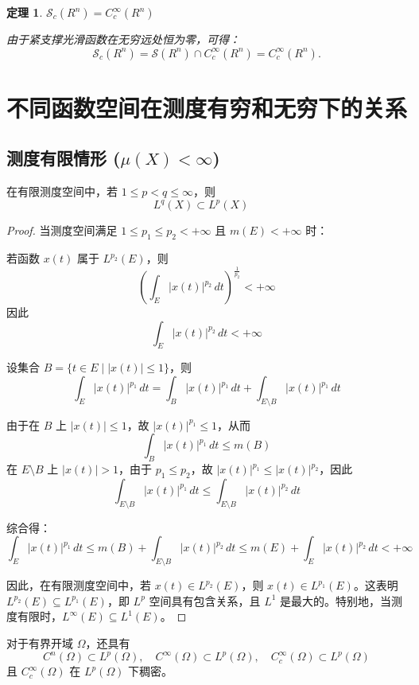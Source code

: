 \documentclass[12pt,a4paper]{article}
\newcommand{\R}{\mathbb{R}}                %
\def\R{R}%
\theoremstyle{plain}
\newtheorem{theorem}{定理}[section]
\theoremstyle{definition}
\theoremstyle{remark}
\begin{document}
\begin{theorem}$\mathcal S_c(\R^n)=C_c^\infty(\R^n)$
	
	
	由于紧支撑光滑函数在无穷远处恒为零，可得：
	\[
	\mathcal S_c(\R^n)
	=\mathcal S(\R^n)\cap C_c^\infty(\R^n)
	=C_c^\infty(\R^n).
	\]
	\end{theorem}
	
	\section{不同函数空间在测度有穷和无穷下的关系}
	
	\subsection{测度有限情形 ($\mu(X)<\infty$)}
	
	在有限测度空间中，若 $1\leq p<q\le\infty$，则
	\[
	L^q(X)\subset L^p(X)\quad
	\]
	
	\begin{proof}
	当测度空间满足 $1 \leq p_1 \leq p_2 < +\infty$ 且 $m(E) < +\infty$ 时：
	
	若函数 $x(t)$ 属于 $L^{p_2}(E)$，则
	\[
	\left( \int_E |x(t)|^{p_2} \, dt \right)^{\frac{1}{p_2}} < +\infty
	\]
	因此
	\[
	\int_E |x(t)|^{p_2} \, dt < +\infty
	\]
	
	设集合 $B = \{ t \in E \mid |x(t)| \leq 1 \}$，则
	\[
	\int_E |x(t)|^{p_1} \, dt = \int_B |x(t)|^{p_1} \, dt + \int_{E \setminus B} |x(t)|^{p_1} \, dt
	\]
	
	由于在 $B$ 上 $|x(t)| \leq 1$，故 $|x(t)|^{p_1} \leq 1$，从而
	\[
	\int_B |x(t)|^{p_1} \, dt \leq m(B)
	\]
	在 $E \setminus B$ 上 $|x(t)| > 1$，由于 $p_1 \leq p_2$，故 $|x(t)|^{p_1} \leq |x(t)|^{p_2}$，因此
	\[
	\int_{E \setminus B} |x(t)|^{p_1} \, dt \leq \int_{E \setminus B} |x(t)|^{p_2} \, dt
	\]
	
	综合得：
	\[
	\int_E |x(t)|^{p_1} \, dt \leq m(B) + \int_{E \setminus B} |x(t)|^{p_2} \, dt \leq m(E) + \int_E |x(t)|^{p_2} \, dt < +\infty
	\]
	
	因此，在有限测度空间中，若 $x(t) \in L^{p_2}(E)$，则 $x(t) \in L^{p_1}(E)$。这表明 $L^{p_2}(E) \subseteq L^{p_1}(E)$，即 $L^p$ 空间具有包含关系，且 $L^1$ 是最大的。特别地，当测度有限时，$L^\infty(E) \subseteq L^1(E)$。
	
	\end{proof}
	
	
	
	
	对于有界开域 $\Omega$，还具有
	\[
	C^n(\Omega)\subset L^p(\Omega),\quad
	C^\infty(\Omega)\subset L^p(\Omega),\quad
	C_c^\infty(\Omega)\subset L^p(\Omega)
	\]
	且 $C_c^\infty(\Omega)$ 在 $L^p(\Omega)$ 下稠密。
	
\end{document}
